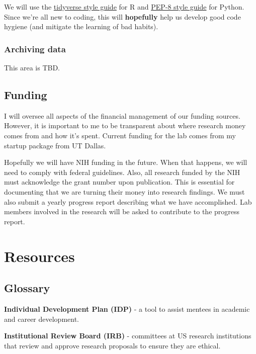 \documentclass[]{book}
\begin{document}
We will use the \href{https://style.tidyverse.org/}{tidyverse style guide} for R and \href{https://www.python.org/dev/peps/pep-0008/}{PEP-8 style guide} for Python. Since we're all new to coding, this will \textbf{hopefully} help us develop good code hygiene (and mitigate the learning of bad habits).

\hypertarget{archiving-data}{%
\subsection{Archiving data}\label{archiving-data}}

This area is TBD.

\hypertarget{funding}{%
\section{Funding}\label{funding}}

I will oversee all aspects of the financial management of our funding sources. However, it is important to me to be transparent about where research money comes from and how it's spent. Current funding for the lab comes from my startup package from UT Dallas.

Hopefully we will have NIH funding in the future. When that happens, we will need to comply with federal guidelines. Also, all research funded by the NIH must acknowledge the grant number upon publication. This is essential for documenting that we are turning their money into research findings. We must also submit a yearly progress report describing what we have accomplished. Lab members involved in the research will be asked to contribute to the progress report.

\hypertarget{resources}{%
\chapter{Resources}\label{resources}}

\hypertarget{glossary}{%
\section{Glossary}\label{glossary}}

\textbf{Individual Development Plan (IDP)} - a tool to assist mentees in academic and career development.

\textbf{Institutional Review Board (IRB)} - committees at US research institutions that review and approve research proposals to ensure they are ethical.
\end{document}
